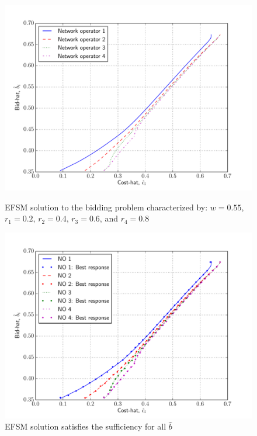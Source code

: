 \begin{figure}[p!]
  \includegraphics[width=\figsize]{Indirect/Figures/efs_4}
  \caption{EFSM solution to the bidding problem characterized by: $w=0.55$, $r_1 = 0.2$, $r_2 = 0.4$, $r_3 = 0.6$, and $r_4 = 0.8$}
  \label{fig:efs_4_indirect}
  \vspace{10mm}
  \includegraphics[width=\figsize]{Indirect/Figures/efs_4_sufficiency}
  \caption{EFSM solution satisfies the sufficiency for all $\hat{b}$}
  \label{fig:efs_4_sufficiency_indirect}
\end{figure}

